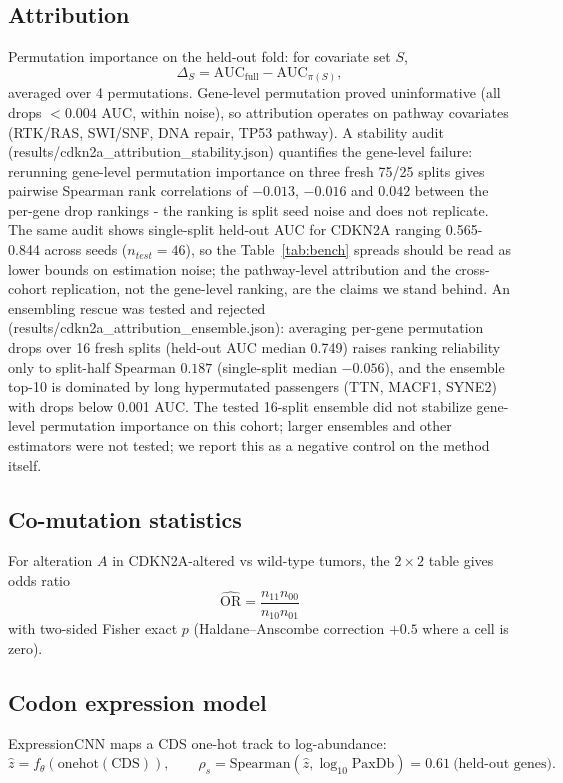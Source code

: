 \documentclass[11pt]{article}
\begin{document}
\subsection{Attribution}
Permutation importance on the held-out fold: for covariate set $S$,
\begin{equation}
\Delta_S = \mathrm{AUC}_{\mathrm{full}}-\mathrm{AUC}_{\pi(S)},
\end{equation}
averaged over 4 permutations. Gene-level permutation proved uninformative (all drops $<0.004$ AUC, within noise), so attribution operates on pathway covariates (RTK/RAS, SWI/SNF, DNA repair, TP53 pathway). A stability audit (results/cdkn2a\_attribution\_stability.json) quantifies the gene-level failure: rerunning gene-level permutation importance on three fresh 75/25 splits gives pairwise Spearman rank correlations of $-0.013$, $-0.016$ and $0.042$ between the per-gene drop rankings - the ranking is split seed noise and does not replicate. The same audit shows single-split held-out AUC for CDKN2A ranging 0.565-0.844 across seeds ($n_{test}=46$), so the Table~\ref{tab:bench} spreads should be read as lower bounds on estimation noise; the pathway-level attribution and the cross-cohort replication, not the gene-level ranking, are the claims we stand behind. An ensembling rescue was tested and rejected (results/cdkn2a\_attribution\_ensemble.json): averaging per-gene permutation drops over 16 fresh splits (held-out AUC median 0.749) raises ranking reliability only to split-half Spearman $0.187$ (single-split median $-0.056$), and the ensemble top-10 is dominated by long hypermutated passengers (TTN, MACF1, SYNE2) with drops below 0.001 AUC. The tested 16-split ensemble did not stabilize gene-level permutation importance on this cohort; larger ensembles and other estimators were not tested; we report this as a negative control on the method itself.
\subsection{Co-mutation statistics}
For alteration $A$ in CDKN2A-altered vs wild-type tumors, the $2\times2$ table gives odds ratio
\begin{equation}
\widehat{\mathrm{OR}}=\frac{n_{11}n_{00}}{n_{10}n_{01}}
\end{equation}
with two-sided Fisher exact $p$ (Haldane--Anscombe correction $+0.5$ where a cell is zero).
\subsection{Codon expression model}
ExpressionCNN maps a CDS one-hot track to log-abundance:
\begin{equation}
\hat z = f_\theta(\mathrm{onehot}(\mathrm{CDS})),\qquad
\rho_s = \mathrm{Spearman}(\hat z, \log_{10}\mathrm{PaxDb}) = 0.61\ \text{(held-out genes).}
\end{equation}
\end{document}
